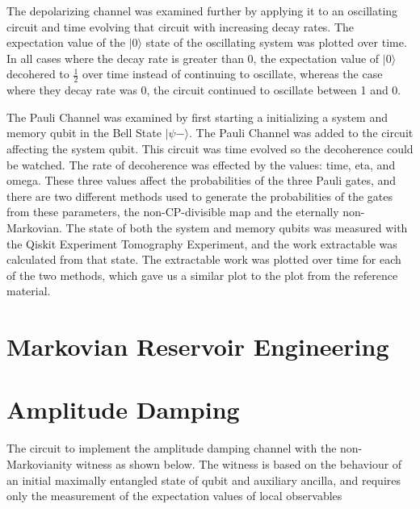 \documentclass[12pt]{article}
\begin{document}
The depolarizing channel was examined further by applying it to an oscillating circuit and time evolving that circuit with increasing decay rates. The expectation value of the $\vert 0 \rangle$ state of the oscillating system was plotted over time. In all cases where the decay rate is greater than 0, the expectation value of $\vert 0 \rangle$ decohered to $\frac{1}{2}$ over time instead of continuing to oscillate, whereas the case where they decay rate was 0, the circuit continued to oscillate between 1 and 0. 

The Pauli Channel was examined by first starting a initializing a system and memory qubit in the Bell State $\vert \psi - \rangle$. The Pauli Channel was added to the circuit affecting the system qubit. This circuit was time evolved so the decoherence could be watched. The rate of decoherence was effected by the values: time, eta, and omega. These three values affect the probabilities of the three Pauli gates, and there are two different methods used to generate the probabilities of the gates from these parameters, the non-CP-divisible map and the eternally non-Markovian. The state of both the system and memory qubits was measured with the Qiskit Experiment Tomography Experiment, and the work extractable was calculated from that state. The extractable work was plotted over time for each of the two methods, which gave us a similar plot to the plot from the reference material.

  \section{Markovian Reservoir Engineering}
  \blindtext

  \section{Amplitude Damping}
  The circuit to implement the amplitude damping channel with the non-Markovianity witness as shown below. The witness is based on the behaviour of an initial maximally entangled state of qubit and auxiliary ancilla, and requires only the measurement of the expectation values of local observables
\end{document}

